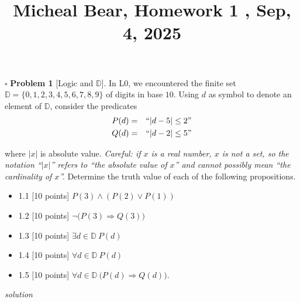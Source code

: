 \documentclass[11pt,twoside]{amsart}
\title {Micheal Bear, Homework 1 , Sep, 4, 2025}
\begin{document}
	\maketitle	

 \noindent $\square$ \textbf{Problem 1}  [\textsf{Logic and $\mathbb{D}$}]. In \textsf{L0}, we encountered the finite set $\mathbb{D} = \{0,1,2,3,4,5,6,7,8,9\}$ of digits in base $10$.  Using $d$ as symbol to denote an element of $\mathbb{D}$, consider the predicates \begin{eqnarray} P(d) &=& \textnormal{``$|d-5| \leq 2$''} \nonumber \\ Q(d) &=& \textnormal{``$|d-2| \leq 5$''}  \nonumber \end{eqnarray}


\noindent where $|x|$ is absolute value.  \textit{Careful: if $x$ is a real number, $x$ is not a set, so the notation ``$|x|$'' refers to ``the absolute value of $x$'' and cannot possibly mean ``the cardinality of $x$''.} Determine the truth value of each of the following propositions.
  \begin{itemize}
  \itemsep0em 
   \item 1.1 [10 points] $P(3) \land (P(2) \lor P(1))$ 
   \item 1.2 [10 points] $\neg \big (P(3) \Rightarrow Q(3) \big )$
   \item 1.3 [10 points] $\exists d \in \mathbb{D} \ P(d)$ 
   \item 1.4 [10 points] $\forall d \in \mathbb{D} \ P(d)$
   \item 1.5 [10 points]  $\forall d \in \mathbb{D} \ \big ( P(d) \Rightarrow Q(d) \big )$.
\end{itemize}



\emph{solution}
\end{document}
